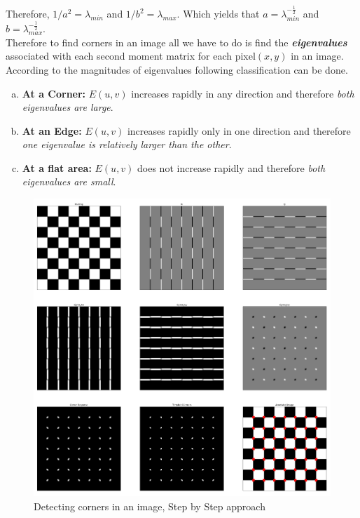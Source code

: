 \documentclass[a4paper,11pt]{article}%
\begin{document}
Therefore, $1/a^2 = \lambda_{min}$ and $1/b^2 = \lambda_{max}$. Which yields that
$a = \lambda_{min}^{-\frac{1}{2}}$ and $b = \lambda_{max}^{-\frac{1}{2}}$.\\

Therefore to find corners in an image all we have to do is find the \textbf{\textit{eigenvalues}} associated with each second moment matrix for each pixel$(x,y)$ in an image. According to the magnitudes of eigenvalues following classification can be done.

\begin{enumerate}[a.)]
	\item  \textbf{At a Corner:} $E(u,v)$ increases rapidly in any direction and therefore \textit{both eigenvalues are large}.
	\item 	\textbf{At an Edge:}  $E(u,v)$ increases rapidly only in one direction and therefore \textit{one eigenvalue is relatively larger than the other}.
	\item \textbf{At a flat area:} $E(u,v)$ does not increase rapidly and therefore \textit{both eigenvalues are small}.
\end{enumerate}


\begin{figure}[!h]
\centering
\includegraphics[scale= 0.3]{figures/corner}
\caption{Detecting corners in an image, Step by Step approach\cite{cv}}
\label{corners}
\end{figure}
\end{document}
